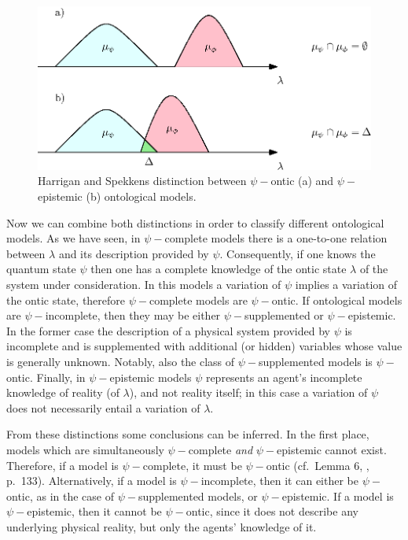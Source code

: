 \documentclass[twocolumn,prl,floatfix,superscriptaddress]{revtex4-2}
\begin{document}
\begin{figure}
\includegraphics[scale=.7]{ontic}
\caption{\footnotesize{Harrigan and Spekkens distinction between $\psi-$ontic (a) and $\psi-$epistemic (b) ontological models.}}
\end{figure}

Now we can combine both distinctions in order to classify different ontological models. As we have seen, in $\psi-$complete models there is a one-to-one relation between $\lambda$ and its description provided by $\psi$. Consequently, if one knows the quantum state $\psi$ then one has a complete knowledge of the ontic state $\lambda$ of the system under consideration. In this models a variation of $\psi$ implies a variation of the ontic state, therefore $\psi-$complete models are $\psi-$ontic. If ontological models are $\psi-$incomplete, then they may be either $\psi-$supplemented or $\psi-$epistemic. In the former case the description of a physical system provided by $\psi$ is incomplete and is supplemented with additional (or hidden) variables whose value is generally unknown. Notably, also the class of $\psi-$supplemented models is $\psi-$ontic. Finally, in $\psi-$epistemic models $\psi$ represents an agent's incomplete knowledge of reality (of $\lambda$), and not reality itself; in this case a variation of $\psi$ does not necessarily entail a variation of $\lambda$.

From these distinctions some conclusions can be inferred. In the first place, models which are simultaneously $\psi-$complete \emph{and} $\psi-$epistemic cannot exist. Therefore, if a model is $\psi-$complete, it must be $\psi-$ontic (cf.\ Lemma 6, \cite{Harrigan:2010}, p.\ 133). Alternatively, if a model is $\psi-$incomplete, then it can either be $\psi-$ontic, as in the case of $\psi-$supplemented models, or $\psi-$epistemic. If a model is $\psi-$epistemic, then it cannot be $\psi-$ontic, since it does not describe any underlying physical reality, but only the agents' knowledge of it. 
\end{document}
